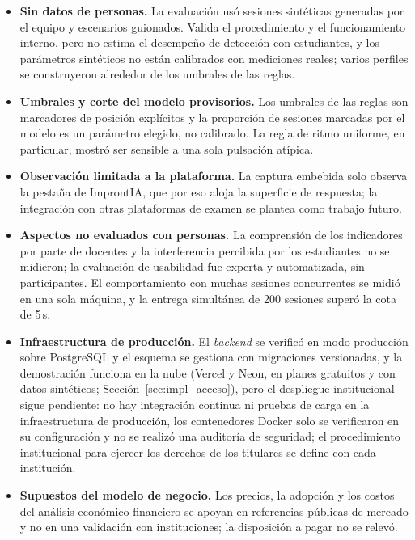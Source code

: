 \begin{itemize}
    \item \textbf{Sin datos de personas.} La evaluación usó sesiones sintéticas generadas por el equipo y escenarios guionados. Valida el procedimiento y el funcionamiento interno, pero no estima el desempeño de detección con estudiantes, y los parámetros sintéticos no están calibrados con mediciones reales; varios perfiles se construyeron alrededor de los umbrales de las reglas.
    \item \textbf{Umbrales y corte del modelo provisorios.} Los umbrales de las reglas son marcadores de posición explícitos y la proporción de sesiones marcadas por el modelo es un parámetro elegido, no calibrado. La regla de ritmo uniforme, en particular, mostró ser sensible a una sola pulsación atípica.
    \item \textbf{Observación limitada a la plataforma.} La captura embebida solo observa la pestaña de ImprontIA, que por eso aloja la superficie de respuesta; la integración con otras plataformas de examen se plantea como trabajo futuro.
    \item \textbf{Aspectos no evaluados con personas.} La comprensión de los indicadores por parte de docentes y la interferencia percibida por los estudiantes no se midieron; la evaluación de usabilidad fue experta y automatizada, sin participantes. El comportamiento con muchas sesiones concurrentes se midió en una sola máquina, y la entrega simultánea de 200 sesiones superó la cota de 5\,s.
    \item \textbf{Infraestructura de producción.} El \textit{backend} se verificó en modo producción sobre PostgreSQL y el esquema se gestiona con migraciones versionadas, y la demostración funciona en la nube (Vercel y Neon, en planes gratuitos y con datos sintéticos; Sección~\ref{sec:impl_acceso}), pero el despliegue institucional sigue pendiente: no hay integración continua ni pruebas de carga en la infraestructura de producción, los contenedores Docker solo se verificaron en su configuración y no se realizó una auditoría de seguridad; el procedimiento institucional para ejercer los derechos de los titulares se define con cada institución.
    \item \textbf{Supuestos del modelo de negocio.} Los precios, la adopción y los costos del análisis económico-financiero se apoyan en referencias públicas de mercado y no en una validación con instituciones; la disposición a pagar no se relevó.
\end{itemize}


